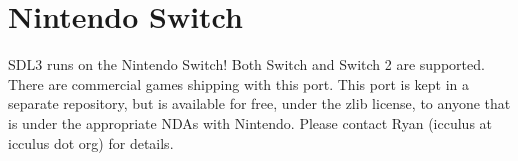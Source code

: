 \chapter{Nintendo Switch }
\hypertarget{md__mono_runtime_2extern_2sdl_2docs_2_r_e_a_d_m_e-switch}{}\label{md__mono_runtime_2extern_2sdl_2docs_2_r_e_a_d_m_e-switch}
\label{md__mono_runtime_2extern_2sdl_2docs_2_r_e_a_d_m_e-switch_autotoc_md1450}%
%


SDL3 runs on the Nintendo Switch! Both Switch and Switch 2 are supported. There are commercial games shipping with this port. This port is kept in a separate repository, but is available for free, under the zlib license, to anyone that is under the appropriate NDAs with Nintendo. Please contact Ryan (icculus at icculus dot org) for details. 